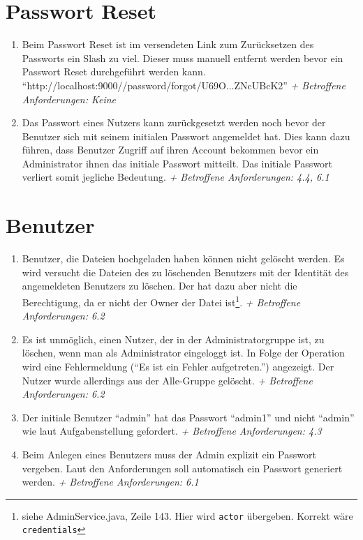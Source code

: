 \documentclass[12pt,DIV14,BCOR10mm,a4paper,parskip=half-,headsepline,headinclude,english,ngerman,bibliography=totocnumbered]{scrreprt}
\begin{document}
 \section{Passwort Reset}
\begin{enumerate}[resume]
\item Beim Passwort Reset ist im versendeten Link zum Zurücksetzen des Passworts ein Slash zu viel. Dieser muss manuell entfernt werden bevor ein Passwort Reset durchgeführt werden kann.\newline
\enquote{http://localhost:9000//password/forgot/U69O...ZNcUBcK2}\newline
\textit{+ Betroffene Anforderungen: Keine}

\item Das Passwort eines Nutzers kann zurückgesetzt werden noch bevor der Benutzer sich mit seinem initialen Passwort angemeldet hat. Dies kann dazu führen, dass Benutzer Zugriff auf ihren Account bekommen bevor ein Administrator ihnen das initiale Passwort mitteilt. Das initiale Passwort verliert somit jegliche Bedeutung.\newline
\textit{+ Betroffene Anforderungen: 4.4, 6.1}
  \end{enumerate}


\section{Benutzer}
\begin{enumerate}[resume]
\item Benutzer, die Dateien hochgeladen haben können nicht gelöscht werden. Es wird versucht die Dateien des zu löschenden Benutzers mit der Identität des angemeldeten Benutzers zu löschen. Der hat dazu aber nicht die Berechtigung, da er nicht der Owner der Datei ist\footnote{siehe AdminService.java, Zeile 143. Hier wird \texttt{actor} übergeben. Korrekt wäre \texttt{credentials}}.\newline
\textit{+ Betroffene Anforderungen: 6.2} 

\item Es ist unmöglich, einen Nutzer, der in der Administratorgruppe ist, zu löschen, wenn man als Administrator eingeloggt ist. In Folge der Operation wird eine Fehlermeldung (\enquote{Es ist ein Fehler aufgetreten.}) angezeigt. Der Nutzer wurde allerdings aus der Alle-Gruppe gelöscht.
\textit{+ Betroffene Anforderungen: 6.2} 


\item Der initiale Benutzer \enquote{admin} hat das Passwort \enquote{admin1} und nicht \enquote{admin} wie laut Aufgabenstellung gefordert.\newline
\textit{+ Betroffene Anforderungen: 4.3} 

\item Beim Anlegen eines Benutzers muss der Admin explizit ein Passwort vergeben. Laut den Anforderungen soll automatisch ein Passwort generiert werden.
\textit{+ Betroffene Anforderungen: 6.1} 
 \end{enumerate}
\end{document}
